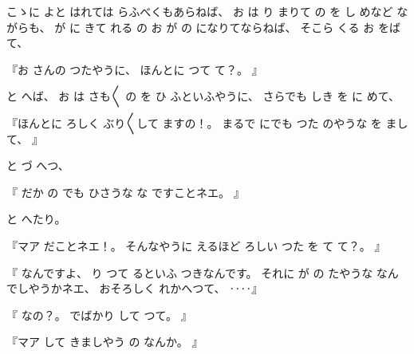 
%
こゝに
よと
はれては
らふべくもあらねば、
%
お
は
り
まりて
の
を
し
めなど
ながらも、
%
が
に
きて
れる
の
お
が
の
になりてならねば、
%
そこら
くる
お
をば
て、

%
『お
さんの
つたやうに、
%
ほんとに
つて
て？。
』

%
と
へば、
%
お
は
さも〳〵
の
を
ひ
ふといふやうに、
%
さらでも
しき
を
に
めて、

%
『ほんとに
ろしく
ぶり〳〵して
ますの！。
%
まるで
にでも
つた%
のやうな
を
まして、
』

%
と
づ
へつ、

%
『
だか
の
でも
ひさうな
な
ですことネエ。
』

%
と
へたり。

%
『マア
だことネエ！。
%
そんなやうに
えるほど
ろしい
つた
を
て
て？。
』

%
『
なんですよ、
%
り
つて
るといふ
つきなんです。
%
それに
が
の
たやうな
なんでしやうかネエ、
%
おそろしく
れかへつて、
%
‥‥』

%
『
なの？。
%
でばかり
して
つて。
』

%
『マア
して
きましやう
の
なんか。
』

